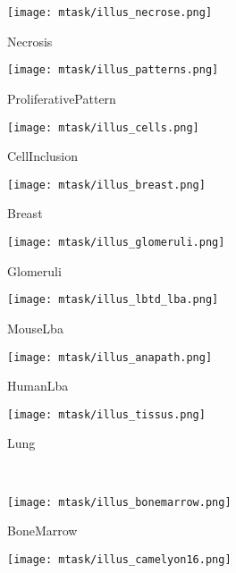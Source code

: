 \begin{figure*}
    \center
    \begin{subfigure}[t]{0.115\textwidth}
        \centering
        \texttt{[image: mtask/illus\_necrose.png]}
        \caption{Necrosis}
    \end{subfigure}
    \begin{subfigure}[t]{0.115\textwidth}
        \centering
        \texttt{[image: mtask/illus\_patterns.png]}
        \caption{ProliferativePattern}
    \end{subfigure}
    \begin{subfigure}[t]{0.115\textwidth}
        \centering
        \texttt{[image: mtask/illus\_cells.png]}
        \caption{CellInclusion}
    \end{subfigure}
    \begin{subfigure}[t]{0.115\textwidth}
        \centering
        \texttt{[image: mtask/illus\_breast.png]}
        \caption{Breast}
    \end{subfigure}
    \begin{subfigure}[t]{0.115\textwidth}
        \centering
        \texttt{[image: mtask/illus\_glomeruli.png]}
        \caption{Glomeruli}
    \end{subfigure}
    \begin{subfigure}[t]{0.115\textwidth}
        \centering
        \texttt{[image: mtask/illus\_lbtd\_lba.png]}
        \caption{MouseLba}
    \end{subfigure}
    \begin{subfigure}[t]{0.115\textwidth}
        \centering
        \texttt{[image: mtask/illus\_anapath.png]}
        \caption{HumanLba}
    \end{subfigure}
    \begin{subfigure}[t]{0.115\textwidth}
        \centering
        \texttt{[image: mtask/illus\_tissus.png]}
        \caption{Lung}
    \end{subfigure} \\
    \begin{subfigure}[t]{0.115\textwidth}
        \centering
        \texttt{[image: mtask/illus\_bonemarrow.png]}
        \caption{BoneMarrow}
    \end{subfigure}    
    \begin{subfigure}[t]{0.115\textwidth}
        \centering
        \texttt{[image: mtask/illus\_camelyon16.png]}

\end{subfigure}
\end{figure*}
